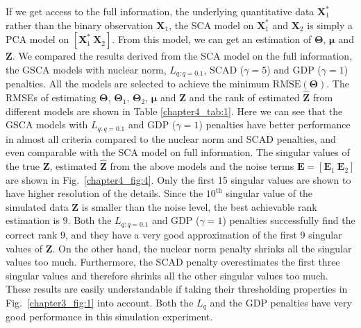 If we get access to the full information, the underlying quantitative data $\mathbf{X}_1^{\ast}$ rather than the binary observation $\mathbf{X}_1$, the SCA model on $\mathbf{X}_1^{\ast}$ and $\mathbf{X}_2$ is simply a PCA model on $[\mathbf{X}_1^{\ast} ~ \mathbf{X}_2]$. From this model, we can get an estimation of $\mathbf{\Theta}$, $\bm{\mu}$ and $\mathbf{Z}$. We compared the results derived from the SCA model on the full information, the GSCA models with nuclear norm, $L_{q:q=0.1}$, SCAD ($\gamma=5$) and GDP ($\gamma=1$) penalties. All the models are selected to achieve the minimum $\text{RMSE}(\mathbf{\Theta})$. The RMSEs of estimating $\mathbf{\Theta}$, $\mathbf{\Theta}_1$, $\mathbf{\Theta}_2$, $\bm{\mu}$ and $\mathbf{Z}$ and the rank of estimated $\hat{\mathbf{Z}}$ from different models are shown in Table \ref{chapter4_tab:1}. Here we can see that the GSCA models with $L_{q:q=0.1}$ and GDP ($\gamma=1$) penalties have better performance in almost all criteria compared to the nuclear norm and SCAD penalties, and even comparable with the SCA model on full information. The singular values of the true $\mathbf{Z}$, estimated $\hat{\mathbf{Z}}$ from the above models and the noise terms $\mathbf{E} = [\mathbf{E}_1~\mathbf{E}_2]$ are shown in Fig.~\ref{chapter4_fig:4}. Only the first 15 singular values are shown to have higher resolution of the details. Since the $10^{\text{th}}$ singular value of the simulated data $\mathbf{Z}$ is smaller than the noise level, the best achievable rank estimation is 9. Both the $L_{q:q=0.1}$ and GDP ($\gamma=1$) penalties successfully find the correct rank 9, and they have a very good approximation of the first 9 singular values of $\mathbf{Z}$. On the other hand, the nuclear norm penalty shrinks all the singular values too much. Furthermore, the SCAD penalty overestimates the first three singular values and therefore shrinks all the other singular values too much. These results are easily understandable if taking their thresholding properties in Fig.~\ref{chapter3_fig:1} into account. Both the $L_{q}$ and the GDP penalties have very good performance in this simulation experiment.

